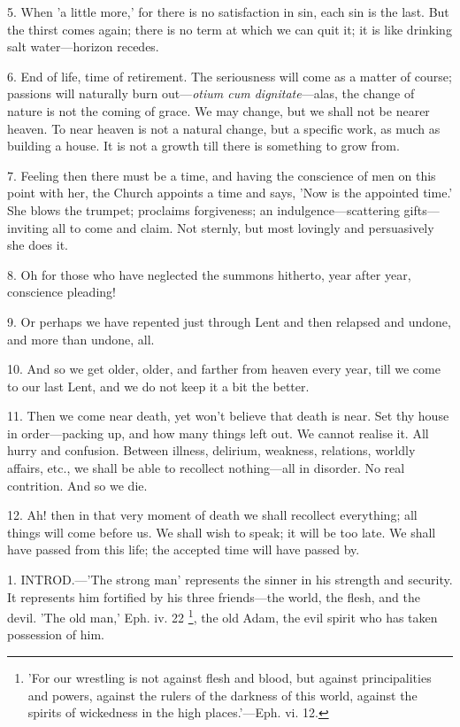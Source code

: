 5. When 'a little more,' for there is no
satisfaction in sin, each sin is the last. But the thirst comes
again; there is no term at which we can quit it; it is like drinking
salt water—horizon recedes.

6. End of life, time of retirement. The
seriousness will come as a matter of course; passions will naturally
burn out—\emph{otium cum dignitate}—alas, the change of nature is
not the coming of grace. We may change, but we shall not be nearer
heaven. To near heaven is not a natural change, but a specific work,
as much as building a house. It is not a growth till there is
something to grow from.

7. Feeling then there must be a time, and having
the conscience of men on this point with her, the Church appoints a
time and says, 'Now is the appointed time.' She blows the trumpet;
proclaims forgiveness; an indulgence—scattering gifts—inviting all
to come and claim. Not sternly, but most lovingly and persuasively she
does it.

8. Oh for those who have neglected the summons
hitherto, year after year, conscience pleading!

9. Or perhaps we have repented just through Lent
and then relapsed and undone, and more than undone, all.

10. And so we get older, older, and farther from
heaven every year, till we come to our last Lent, and we do not keep
it a bit the better.

11. Then we come near death, yet won't believe
that death is near. Set thy house in order—packing up, and how many
things left out. We cannot realise it. All hurry and confusion.
Between illness, delirium, weakness, relations, worldly affairs, etc.,
we shall be able to recollect nothing—all in disorder. No real
contrition. And so we die.

12. Ah! then in that very moment of death we
shall recollect everything; all things will come before us. We shall
wish to speak; it will be too late. We shall have passed from this
life; the accepted time will have passed by.


1. INTROD.—'The
strong man' represents the sinner in his strength and security. It
represents him fortified by his three friends—the world, the flesh,
and the devil. 'The old man,' Eph. iv. 22 \footnote{'For our wrestling is
not against flesh and blood, but against principalities and powers,
against the rulers of the darkness of this world, against the spirits
of wickedness in the high places.'—Eph. vi. 12.}, the old Adam, the evil spirit who has taken possession of
him.


